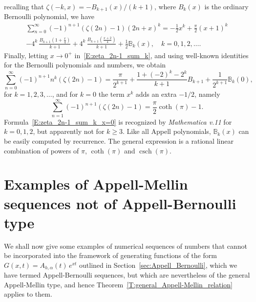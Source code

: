 \documentclass[11pt,a4paper]{amsart}
\newcommand{\B}{\mathbb{B}}
\theoremstyle{plain}
\theoremstyle{plain}
\theoremstyle{definition}
\theoremstyle{remark}
\begin{document}
recalling that $\zeta(-k,x) = -B_{k+1}(x)/(k+1)$, where $B_{k}(x)$ is the ordinary Bernoulli polynomial, we have
\begin{multline}
\label{E:zeta_2n-1_sum_k}
	  \sum_{n=0}^{\infty} (-1)^{n+1} (\zeta(2n) - 1) (2n + x)^{k}
	= - \frac{1}{2} x^{k}
	  + \frac{\pi}{2} (x+1)^{k}
	  \\
	  - 4^{k} \, \frac{B_{k+1}(1+\frac{x}{4})}{k+1}
	  + 4^{k} \, \frac{B_{k+1}(\frac{x+2}{4})}{k+1}
	  + \frac{1}{2} \B_{k}(x),
	  \quad
	  k=0,1,2,\dots.
\end{multline}
Finally, letting $x \to 0^{+}$ in~\eqref{E:zeta_2n-1_sum_k}, and using well-known identities for the Bernoulli polynomials and numbers, we obtain
\begin{equation}
\label{E:zeta_2n-1_sum_k_x=0}	
	  \sum_{n=0}^{\infty} (-1)^{n+1} n^{k} (\zeta(2n) - 1)
	= \frac{\pi}{2^{k+1}} + \frac{1 + (-2)^{k} - 2^{k}}{k+1} B_{k+1} + \frac{1}{2^{k+1}} \B_{k}(0),
\end{equation}
for $k=1,2,3,\dots$, and for $k=0$ the term $x^{k}$ adds an extra $-1/2$, namely
\[
	  \sum_{n=1}^{\infty} (-1)^{n+1} (\zeta(2n) - 1)
	= \frac{\pi}{2} \coth(\pi) - 1.
\]
Formula~\eqref{E:zeta_2n-1_sum_k_x=0} is recognized by \emph{Mathematica v.11} for $k=0,1,2$, but apparently not for $k \geq 3$. Like all Appell polynomials, $\B_{k}(x)$ can be easily computed by recurrence. The general expression is a rational linear combination of powers of $\pi$, $\coth(\pi)$ and $\operatorname{csch}(\pi)$.


\section{Examples of Appell-Mellin sequences not of Appell-Bernoulli type}
\label{sec:Mellin_non-Bernoulli}



We shall now give some examples of numerical sequences of numbers that cannot be incorporated into the framework of generating functions of the form $G(x,t) = A_{h,\alpha}(t) \, e^{xt}$ outlined in Section~\ref{sec:Appell_Bernoulli}, which we have termed Appell-Bernoulli sequences, but which are nevertheless of the general Appell-Mellin type, and hence Theorem~\ref{T:general_Appell-Mellin_relation} applies to them.
\end{document}
